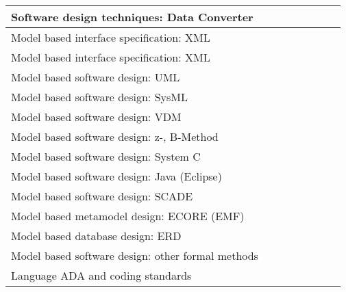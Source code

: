 \documentclass[a4paper, 11pt]{article}
\begin{document}
\begin{center}
\begin{longtable}{|r|r|r|r|r|r|r|r|}
    \hline
    \multicolumn{1}{|l|}{Software design techniques: Data Converter} & \multicolumn{1}{l|}{} &       &       &       &       &       &  \bigstrut\\
    \hline
    \multicolumn{1}{|l|}{Model based interface specification: XML} & \multicolumn{1}{l|}{} &       &       &       &       &       &  \bigstrut\\
    \hline
    \multicolumn{1}{|l|}{Model based interface specification: XML} & \multicolumn{1}{l|}{} &       &       &       &       &       &  \bigstrut\\
    \hline
    \multicolumn{1}{|l|}{Model based software design: UML} & \multicolumn{1}{l|}{} &       &       &       &       &       &  \bigstrut\\
    \hline
    \multicolumn{1}{|l|}{Model based software design: SysML} & \multicolumn{1}{l|}{} &       &       &       &       &       &  \bigstrut\\
    \hline
    \multicolumn{1}{|l|}{Model based software design: VDM} & \multicolumn{1}{l|}{} &       &       &       &       &       &  \bigstrut\\
    \hline
    \multicolumn{1}{|l|}{Model based software design: z-, B-Method} & \multicolumn{1}{l|}{} &       &       &       &       &       &  \bigstrut\\
    \hline
    \multicolumn{1}{|l|}{Model based software design: System C} & \multicolumn{1}{l|}{} &       &       &       &       &       &  \bigstrut\\
    \hline
    \multicolumn{1}{|l|}{Model based software design: Java (Eclipse)} & \multicolumn{1}{l|}{} &       &       &       &       &       &  \bigstrut\\
    \hline
    \multicolumn{1}{|l|}{Model based software design: SCADE} & \multicolumn{1}{l|}{} &       &       &       &       &       &  \bigstrut\\
    \hline
    \multicolumn{1}{|l|}{Model based metamodel design: ECORE (EMF)} & \multicolumn{1}{l|}{} &       &       &       &       &       &  \bigstrut\\
    \hline
    \multicolumn{1}{|l|}{Model based database design: ERD} & \multicolumn{1}{l|}{} &       &       &       &       &       &  \bigstrut\\
    \hline
    \multicolumn{1}{|l|}{Model based software design: other formal methods} & \multicolumn{1}{l|}{} &       &       &       &       &       &  \bigstrut\\
    \hline
    \multicolumn{1}{|l|}{Language ADA and coding standards} & \multicolumn{1}{l|}{} &       &       &       &       &       &  \bigstrut\\

\end{longtable}
\end{center}
\end{document}
